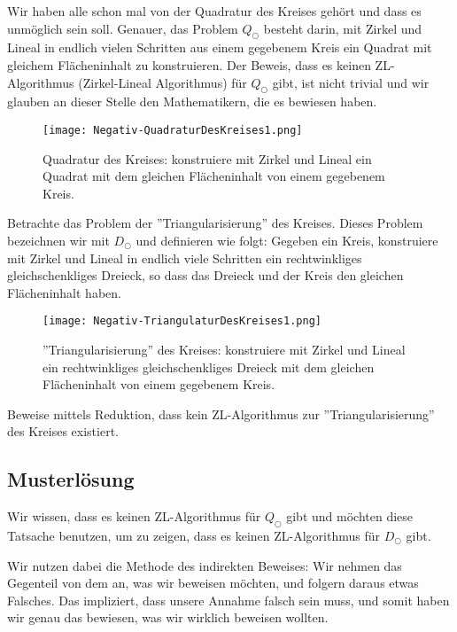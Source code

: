 \documentclass[
	12pt, %
	german, %
]{fphw}
\begin{document}
\begin{problem}
Wir haben alle schon mal von der Quadratur des Kreises gehört und dass es unmöglich sein soll. Genauer, das Problem \(Q_{\bigcirc}\) besteht darin, mit Zirkel und Lineal in endlich vielen Schritten aus einem gegebenem Kreis ein Quadrat mit gleichem Flächeninhalt zu konstruieren. Der Beweis, dass es keinen ZL-Algorithmus (Zirkel-Lineal Algorithmus) für \(Q_{\bigcirc}\) gibt, ist nicht trivial und wir glauben an dieser Stelle den Mathematikern, die es bewiesen haben.

\begin{figure}[H]
	\centering
	\texttt{[image: Negativ-QuadraturDesKreises1.png]}
	\caption{Quadratur des Kreises: konstruiere mit Zirkel und Lineal ein Quadrat mit dem gleichen Flächeninhalt von einem gegebenem Kreis.}
\end{figure}

Betrachte das Problem der ''Triangularisierung'' des Kreises. Dieses Problem bezeichnen wir mit \(D_{\bigcirc}\) und definieren wie folgt: Gegeben ein Kreis, konstruiere mit Zirkel und Lineal in endlich viele Schritten ein rechtwinkliges gleichschenkliges Dreieck, so dass das Dreieck und der Kreis den gleichen Flächeninhalt haben.
\begin{figure}[H]
	\centering
	\texttt{[image: Negativ-TriangulaturDesKreises1.png]}
	\caption{''Triangularisierung'' des Kreises: konstruiere mit Zirkel und Lineal ein rechtwinkliges gleichschenkliges Dreieck mit dem gleichen Flächeninhalt von einem gegebenem Kreis.}
\end{figure}
Beweise mittels Reduktion, dass kein ZL-Algorithmus zur ''Triangularisierung'' des Kreises existiert.
\end{problem}


\subsection*{Musterlösung}

Wir wissen, dass es keinen ZL-Algorithmus für \(Q_{\bigcirc}\) gibt und möchten diese Tatsache benutzen, um zu zeigen, dass es keinen ZL-Algorithmus für \(D_{\bigcirc}\) gibt.

Wir nutzen dabei die Methode des indirekten Beweises: Wir nehmen das Gegenteil von dem an, was wir beweisen möchten, und folgern daraus etwas Falsches. Das impliziert, dass unsere Annahme falsch sein muss, und somit haben wir genau das bewiesen, was wir wirklich beweisen wollten.
\end{document}
